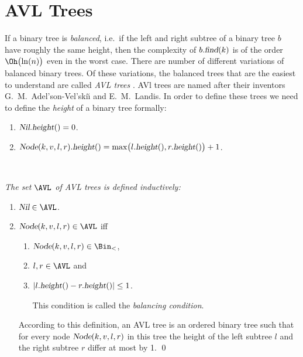 \section{AVL Trees}
If a binary tree is \emph{balanced}, i.e.~if the left and right subtree of a binary tree $b$  have
roughly the same height, then the complexity of $b.\textsl{find}(k)$ is of the order
$\Oh\bigl(\ln(n)\bigr)$  even in the worst case.  There are number of different variations of
balanced binary trees.  Of these variations, the balanced trees that are the easiest to understand are
called  \emph{AVL trees} \cite{adelson:62}.  AVl trees are 
named after their inventors G.~M.~Adel'son-Vel'ski\u{\i} and E.~M.~Landis.  In order to define these
trees we need to define the \emph{height} of a binary tree formally:
\begin{enumerate}
\item $\textsl{Nil}.\textsl{height}() = 0$.
\item $\textsl{Node}(k,v,l,r).\textsl{height}() = 
       \max\bigl( l.\textsl{height}(), r.\textsl{height}() \bigr) + 1$. \eox
\end{enumerate}

\begin{Definition} \hspace*{\fill} \\
{\em 
  The set $\AVL$ of \emph{AVL trees} is defined inductively:
  \begin{enumerate}
  \item $\textsl{Nil} \in \AVL$.
  \item $\textsl{Node}(k,v,l,r) \in \AVL$ \quad iff 
        \begin{enumerate}
        \item $\textsl{Node}(k,v,l,r) \in \Bin_<$,
        \item $l, r \in \AVL$ \quad and
        \item $|l.\textsl{height}() - r.\textsl{height}()| \leq 1$.

              This condition is called the \emph{balancing condition}.
        \end{enumerate}
        According to this definition, an AVL tree is an ordered binary tree such that for every node
        $\textsl{Node}(k,v,l,r)$ in this tree the height of the left subtree $l$ and the right
        subtree  $r$ differ at most by 1.  \qed
  \end{enumerate}
}  
\end{Definition}

